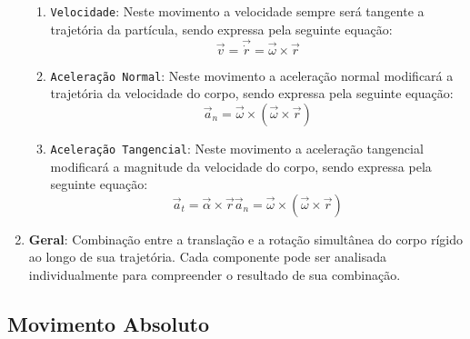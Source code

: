 \documentclass{article}
\begin{document}
\begin{enumerate}[rightmargin = \leftmargin]
                        \begin{enumerate}[rightmargin = \leftmargin]
                            \item \texttt{Velocidade}: Neste movimento a velocidade sempre será tangente a trajetória da partícula, sendo expressa pela seguinte equação:
                                \begin{equation}
                                    \boxed{
                                        \vec{v} = \vec{\dot{r}} = \vec{\omega}\times\vec{r}
                                    }
                                \end{equation}
        
                            \item \texttt{Aceleração Normal}: Neste movimento a aceleração normal modificará a trajetória da velocidade do corpo, sendo expressa pela seguinte equação:
                                \begin{equation}
                                    \boxed{
                                        \vec{a}_{n} = \vec{\omega} \times (\vec{\omega}\times\vec{r})
                                    }
                                \end{equation}
        
                            \item \texttt{Aceleração Tangencial}: Neste movimento a aceleração tangencial modificará a magnitude da velocidade do corpo, sendo expressa pela seguinte equação:
                                \begin{equation}
                                    \boxed{
                                        \vec{a}_{t} = \vec{\alpha} \times \vec{r}
                                        \vec{a}_{n} = \vec{\omega} \times (\vec{\omega}\times\vec{r})
                                    }
                                \end{equation}
                        \end{enumerate}

                    \item \textbf{Geral}: Combinação entre a translação e a rotação simultânea do corpo rígido ao longo de sua trajetória. Cada componente pode ser analisada individualmente para compreender o resultado de sua combinação.
                \end{enumerate}

        \subsection{Movimento Absoluto}
\end{document}
